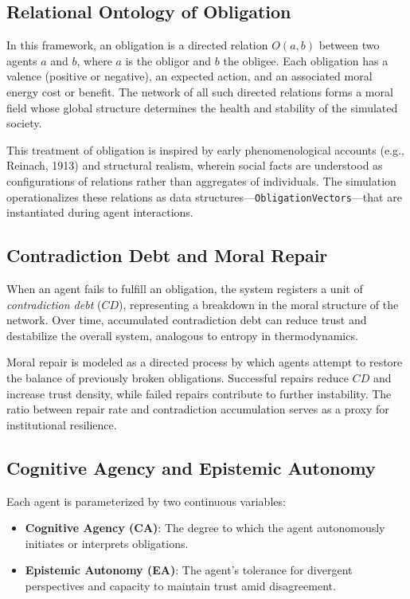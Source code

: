 \documentclass[11pt]{article}
\begin{document}
\subsection{Relational Ontology of Obligation}

In this framework, an obligation is a directed relation $O(a,b)$ between two agents $a$ and $b$, where $a$ is the obligor and $b$ the obligee. Each obligation has a valence (positive or negative), an expected action, and an associated moral energy cost or benefit. The network of all such directed relations forms a moral field whose global structure determines the health and stability of the simulated society.

This treatment of obligation is inspired by early phenomenological accounts (e.g., Reinach, 1913) and structural realism, wherein social facts are understood as configurations of relations rather than aggregates of individuals. The simulation operationalizes these relations as data structures—\texttt{ObligationVectors}—that are instantiated during agent interactions.

\subsection{Contradiction Debt and Moral Repair}

When an agent fails to fulfill an obligation, the system registers a unit of \textit{contradiction debt} ($CD$), representing a breakdown in the moral structure of the network. Over time, accumulated contradiction debt can reduce trust and destabilize the overall system, analogous to entropy in thermodynamics.

Moral repair is modeled as a directed process by which agents attempt to restore the balance of previously broken obligations. Successful repairs reduce $CD$ and increase trust density, while failed repairs contribute to further instability. The ratio between repair rate and contradiction accumulation serves as a proxy for institutional resilience.

\subsection{Cognitive Agency and Epistemic Autonomy}

Each agent is parameterized by two continuous variables:
\begin{itemize}
  \item \textbf{Cognitive Agency (CA)}: The degree to which the agent autonomously initiates or interprets obligations.
  \item \textbf{Epistemic Autonomy (EA)}: The agent’s tolerance for divergent perspectives and capacity to maintain trust amid disagreement.
\end{itemize}
\end{document}
